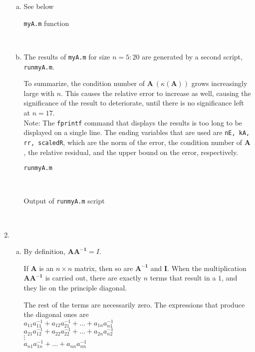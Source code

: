 \documentclass[11pt]{article}
\begin{document}
\begin{enumerate}
\begin{enumerate}[(a)]
		\item See below

			\begin{center}
				\texttt{myA.m} function
			\end{center}
			 \

		\item The results of \texttt{myA.m} for size $n =5:20$ are generated by a second script, \texttt{runmyA.m}.

			To summarize,
			the condition number of $\mathbf{A}\ (\kappa(\mathbf{A}))$ grows increasingly large with $n$. This causes the relative
			error to increase as well, causing the significance of the result to deteriorate, until there is no significance left
			at $n=17$. \\

			Note: The \texttt{fprintf} command that displays the results is too long to be displayed on a single line. The ending
			variables that are used are \texttt{nE, kA, rr, scaledR}, which are the norm of the error, the condition number of
			$\mathbf{A}$, the relative residual, and the upper bound on the error, respectively.

			\begin{center}
				\texttt{runmyA.m}
			\end{center}
			 \

			\begin{center}
				Output of \texttt{runmyA.m} script
			\end{center}
			 \

	\end{enumerate}

	\item

		\begin{enumerate}[(a)]
			\item By definition, $\mathbf{AA^{-1}} = I$.

				If $\mathbf{A}$ is an $n\times n$ matrix, then so are $\mathbf{A^{-1}}$ and $\mathbf{I}$. When the multiplication
				$\mathbf{AA^{-1}}$ is carried out, there are exactly $n$ terms that result in a $1$, and they lie on the principle
				diagonal.

				The rest of the terms are necessarily zero. The expressions that produce the diagonal ones are \\
				$a_{11}a^{-1}_{11} + a_{12}a^{-1}_{21} + \dots + a_{1n}a^{-1}_{n1}$ \\
				$a_{21}a^{-1}_{12} + a_{22}a^{-1}_{22} + \dots  + a_{2n}a^{-1}_{n2}$ \\
				$\vdots$ \\
				$a_{n1}a^{-1}_{1n} + \dots + a_{nn}a^{-1}_{nn}$ \\


\end{enumerate}
\end{enumerate}
\end{document}
